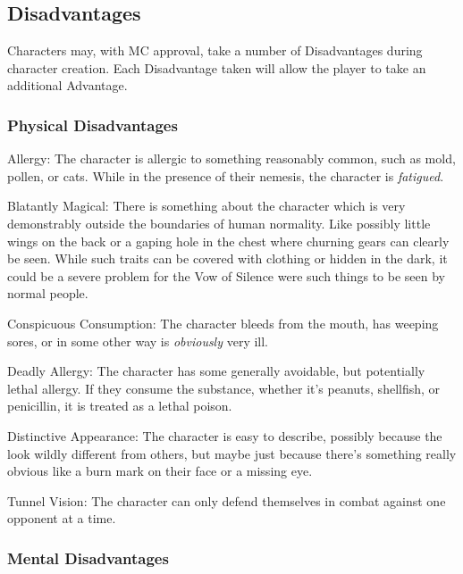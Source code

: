 \subsection{Disadvantages}

\hspace{\parindent} Characters may, with MC approval, take a number of Disadvantages during character creation. Each Disadvantage taken will allow the player to take an additional Advantage.

\subsubsection{Physical Disadvantages}

\begin{description*}
\item[Allergy:] The character is allergic to something reasonably common, such as mold, pollen, or cats. While in the presence of their nemesis, the character is \textit{fatigued}.
\item[Blatantly Magical:] There is something about the character which is very demonstrably outside the boundaries of human normality. Like possibly little wings on the back or a gaping hole in the chest where churning gears can clearly be seen. While such traits can be covered with clothing or hidden in the dark, it could be a severe problem for the Vow of Silence were such things to be seen by normal people.
\item[Conspicuous Consumption:] The character bleeds from the mouth, has weeping sores, or in some other way is \textit{obviously} very ill.
\item[Deadly Allergy:] The character has some generally avoidable, but potentially lethal allergy. If they consume the substance, whether it's peanuts, shellfish, or penicillin, it is treated as a lethal poison.
\item[Distinctive Appearance:] The character is easy to describe, possibly because the look wildly different from others, but maybe just because there's something really obvious like a burn mark on their face or a missing eye.
\item[Tunnel Vision:] The character can only defend themselves in combat against one opponent at a time.
\end{description*}

\subsubsection{Mental Disadvantages}


